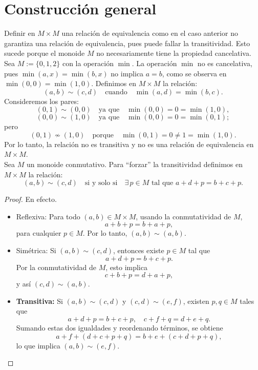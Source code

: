 



\section{Construcción general}

\noindent Definir en \( M \times M \) una relación de equivalencia como en el caso anterior no garantiza una relación de equivalencia, pues puede fallar la transitividad. Esto sucede porque el monoide \( M \) no necesariamente tiene la propiedad cancelativa.\\

\noindent Sea $M := \{0,1,2\} $
con la operación \(\min\). La operación \( \min \) no es cancelativa, pues \( \min(a, x) = \min(b, x) \) no implica \( a = b \), como se observa en \( \min(0,0) = \min(1,0) \). Definimos en \( M \times M \) la relación:
\[
(a,b) \sim (c,d) \quad \text{cuando} \quad \min(a,d) = \min(b,c).
\]Consideremos los pares:
\[
(0,1) \sim (0,0) \quad \text{ya que} \quad \min(0,0) = 0 = \min(1,0),
\]
\[
(0,0) \sim (1,0) \quad \text{ya que} \quad \min(0,0) = 0 = \min(0,1);
\]
pero
\[
(0,1) \not\sim (1,0) \quad \text{porque} \quad \min(0,1) = 0 \neq 1 = \min(1,0).
\]Por lo tanto, la relación no es transitiva y no es una relación de equivalencia en \( M \times M \).\\

Sea \(M\) un monoide conmutativo. Para ``forzar'' la transitividad definimos en \(M \times M\) la relación:
\[
(a,b) \sim (c,d) \quad \text{si y solo si} \quad \exists\, p \in M \text{ tal que } a + d + p = b + c + p.
\]

\begin{proposicion}
\end{proposicion}

\begin{proof}
	En efecto.
	\begin{itemize}
		\item Reflexiva: Para todo \((a,b) \in M \times M\), usando la conmutatividad de \(M\),
		\[
		a + b + p = b + a + p,
		\]
		para cualquier \(p \in M\). Por lo tanto, \((a,b) \sim (a,b)\).
		
		\item Simétrica: Si \((a,b) \sim (c,d)\), entonces existe \(p \in M\) tal que
		\[
		a + d + p = b + c + p.
		\]
		Por la conmutatividad de \(M\), esto implica
		\[
		c + b + p = d + a + p,
		\]
		y así \((c,d) \sim (a,b)\).
		
		\item \textbf{Transitiva:} Si \((a,b) \sim (c,d)\) y \((c,d) \sim (e,f)\), existen \(p,q \in M\) tales que
		\[
		a + d + p = b + c + p, \quad c + f + q = d + e + q.
		\]
		Sumando estas dos igualdades y reordenando términos, se obtiene
		\[
		a + f + (d + c + p + q) = b + e + (c + d + p + q),
		\]
		lo que implica \((a,b) \sim (e,f)\).
	\end{itemize}
\end{proof}

